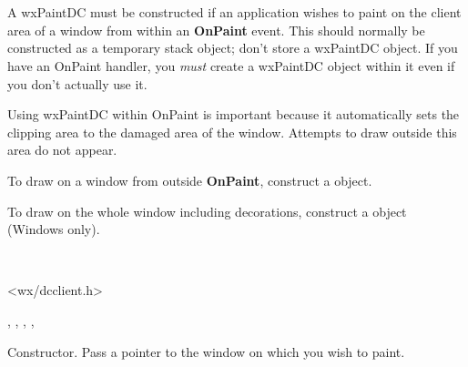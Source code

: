 \section{}\label{wxpaintdc}

A wxPaintDC must be constructed if an application wishes to paint on the
client area of a window from within an {\bf OnPaint} event.
This should normally be constructed as a temporary stack object; don't store
a wxPaintDC object. If you have an OnPaint handler, you {\it must} create a wxPaintDC
object within it even if you don't actually use it.

Using wxPaintDC within OnPaint is important because it automatically
sets the clipping area to the damaged area of the window. Attempts to draw
outside this area do not appear.

To draw on a window from outside {\bf OnPaint}, construct a  object.

To draw on the whole window including decorations, construct a  object
(Windows only).


\\


<wx/dcclient.h>




, , ,\rtfsp
{}, 


\label{wxpaintdcctor}


Constructor. Pass a pointer to the window on which you wish to paint.



